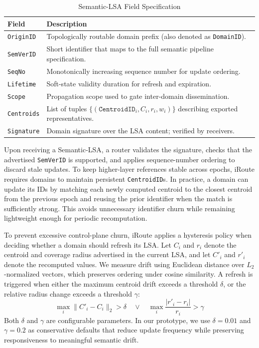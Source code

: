 \documentclass[conference]{IEEEtran}
\newcommand{\sysname}{iRoute}
\begin{document}
\begin{table}[h]
\centering
\caption{Semantic-LSA Field Specification}
\label{tab:lsa_format}
\renewcommand{\arraystretch}{1.3}
\begin{tabular}{l|p{5.0cm}}
\toprule
\textbf{Field} & \textbf{Description} \\
\midrule
\texttt{OriginID} & Topologically routable domain prefix (also denoted as \texttt{DomainID}). \\
\texttt{SemVerID} & Short identifier that maps to the full semantic pipeline specification. \\
\texttt{SeqNo} & Monotonically increasing sequence number for update ordering. \\
\texttt{Lifetime} & Soft-state validity duration for refresh and expiration. \\
\texttt{Scope} & Propagation scope used to gate inter-domain dissemination. \\
\texttt{Centroids} & List of tuples $\{(\texttt{CentroidID}_i, C_i, r_i, w_i)\}$ describing exported representatives. \\
\texttt{Signature} & Domain signature over the LSA content; verified by receivers. \\
\bottomrule
\end{tabular}
\end{table}

Upon receiving a Semantic-LSA, a router validates the signature, checks that the advertised \texttt{SemVerID} is supported, and applies sequence-number ordering to discard stale updates.
To keep higher-layer references stable across epochs, \sysname{} requires domains to maintain persistent \texttt{CentroidID}s.
In practice, a domain can update its IDs by matching each newly computed centroid to the closest centroid from the previous epoch and reusing the prior identifier when the match is sufficiently strong.
This avoids unnecessary identifier churn while remaining lightweight enough for periodic recomputation.

To prevent excessive control-plane churn, \sysname{} applies a hysteresis policy when deciding whether a domain should refresh its LSA.
Let $C_i$ and $r_i$ denote the centroid and coverage radius advertised in the current LSA, and let $C'_i$ and $r'_i$ denote the recomputed values.
We measure drift using Euclidean distance over $L_2$-normalized vectors, which preserves ordering under cosine similarity.
A refresh is triggered when either the maximum centroid drift exceeds a threshold $\delta$, or the relative radius change exceeds a threshold $\gamma$:
\begin{equation}
    \max_i \|C'_{i} - C_{i}\|_2 > \delta \quad \lor \quad \max_i \frac{|r'_{i} - r_{i}|}{r_{i}} > \gamma
\end{equation}
Both $\delta$ and $\gamma$ are configurable parameters.
In our prototype, we use $\delta=0.01$ and $\gamma=0.2$ as conservative defaults that reduce update frequency while preserving responsiveness to meaningful semantic drift.
\end{document}
